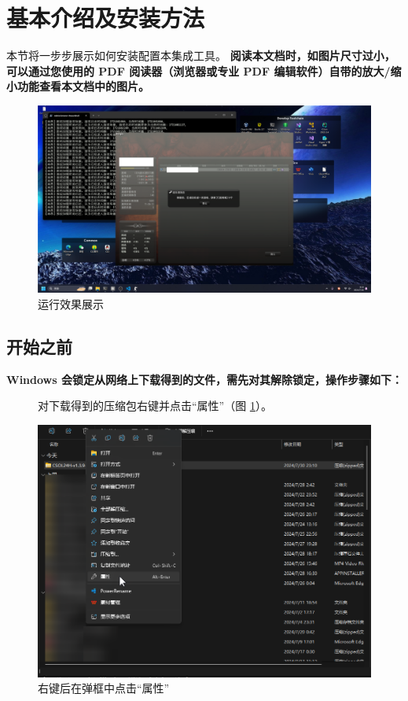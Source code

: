\section{基本介绍及安装方法}

本节将一步步展示如何安装配置本集成工具。\textbf{\color{red} 阅读本文档时，如图片尺寸过小，可以通过您使用的 PDF 阅读器（浏览器或专业 PDF 编辑软件）自带的放大/缩小功能查看本文档中的图片。}

\begin{figure}[H]
    \Centering
    \includegraphics[width=\textwidth]{docs/assets/intro/controller.png}
    \caption{运行效果展示}
\end{figure}

\subsection{开始之前}

\textbf{\color{red}Windows 会锁定从网络上下载得到的文件，需先对其解除锁定，操作步骤如下：}

\begin{figure}[H]
    \Centering
    \parbox[l]{\textwidth}{对下载得到的压缩包右键并点击“属性”（图 \ref{ch0fig-unlock-0}）。}
    \includegraphics[width=\textwidth]{docs/assets/intro/unlock_00.png}
    \caption{右键后在弹框中点击“属性”}
    \label{ch0fig-unlock-0}
\end{figure}

